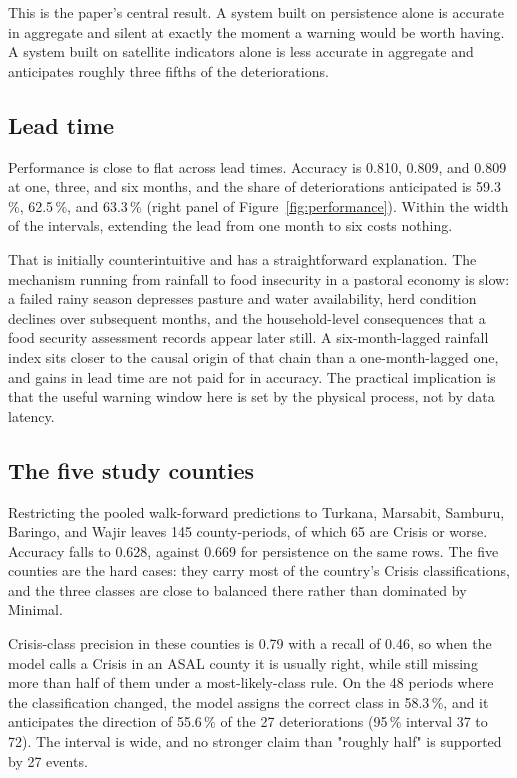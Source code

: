 \documentclass[11pt]{article}
\begin{document}
This is the paper's central result. A system built on persistence alone is
accurate in aggregate and silent at exactly the moment a warning would be worth
having. A system built on satellite indicators alone is less accurate in
aggregate and anticipates roughly three fifths of the deteriorations.

\subsection{Lead time}

Performance is close to flat across lead times. Accuracy is 0.810, 0.809, and
0.809 at one, three, and six months, and the share of deteriorations anticipated
is 59.3\,\%, 62.5\,\%, and 63.3\,\% (right panel of Figure~\ref{fig:performance}).
Within the width of the intervals, extending the lead from one month to six
costs nothing.

That is initially counterintuitive and has a straightforward explanation. The
mechanism running from rainfall to food insecurity in a pastoral economy is slow:
a failed rainy season depresses pasture and water availability, herd condition
declines over subsequent months, and the household-level consequences that a food
security assessment records appear later still. A six-month-lagged rainfall index
sits closer to the causal origin of that chain than a one-month-lagged one, and
gains in lead time are not paid for in accuracy. The practical implication is
that the useful warning window here is set by the physical process, not by data
latency.

\subsection{The five study counties}

Restricting the pooled walk-forward predictions to Turkana, Marsabit, Samburu,
Baringo, and Wajir leaves 145 county-periods, of which 65 are Crisis or worse.
Accuracy falls to 0.628, against 0.669 for persistence on the same rows. The
five counties are the hard cases: they carry most of the country's Crisis
classifications, and the three classes are close to balanced there rather than
dominated by Minimal.

Crisis-class precision in these counties is 0.79 with a recall of 0.46, so when
the model calls a Crisis in an ASAL county it is usually right, while still
missing more than half of them under a most-likely-class rule. On the 48 periods
where the classification changed, the model assigns the correct class in
58.3\,\%, and it anticipates the direction of 55.6\,\% of the 27 deteriorations
(95\,\% interval 37 to 72). The interval is wide, and no stronger claim than
"roughly half" is supported by 27 events.
\end{document}
